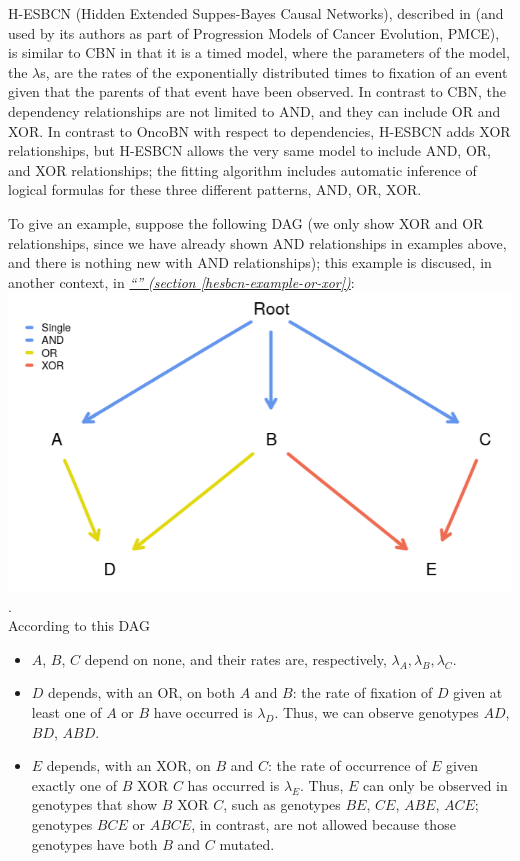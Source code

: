 \documentclass[a4paper,11pt]{article}
\newcommand*{\qref}[1]{\hyperref[{#1}]{\textit{``\nameref*{#1}'' (section \ref*{#1})}}}
\begin{document}
H-ESBCN (Hidden Extended Suppes-Bayes Causal Networks), described in \citet{angaroni2021} (and used by its authors as part of Progression Models of Cancer Evolution, PMCE), is similar to CBN in that it is a timed model, where the parameters of the model, the $\lambda$s,  are  the rates of the exponentially distributed times to fixation of an  event given that the parents of that event have been observed. In contrast to CBN, the dependency relationships are not limited to AND, and they can include OR and XOR. In contrast to OncoBN with respect to dependencies, H-ESBCN adds XOR relationships, but H-ESBCN allows the very same model to include AND, OR, and XOR relationships; the fitting algorithm includes automatic inference of logical formulas for these three different patterns, AND, OR, XOR.


To give an example, suppose the following DAG (we only show XOR and OR relationships, since we have already shown AND relationships in examples above, and there is nothing new with AND relationships); this example is discused, in another context, in \qref{hesbcn-example-or-xor}:\\

\includegraphics[width=.60\linewidth]{./dag-h-1.png}.\\

According to this DAG
\begin{itemize}
 \item $A$, $B$, $C$ depend on none, and their rates are, respectively, $\lambda_A, \lambda_B, \lambda_C$.
 \item $D$ depends, with an OR, on both $A$ and $B$: the rate of fixation of $D$ given at least one of $A$ or $B$ have occurred is $\lambda_D$. Thus, we can observe genotypes $AD$, $BD$, $ABD$.
 \item $E$ depends, with an XOR, on $B$ and $C$: the rate of occurrence of $E$ given exactly one of $B$ XOR $C$ has occurred is $\lambda_E$. Thus, $E$ can only be observed in genotypes that show $B$ XOR $C$, such as genotypes $BE$, $CE$, $ABE$, $ACE$; genotypes $BCE$ or $ABCE$, in contrast, are not allowed because those genotypes have both $B$ and $C$ mutated. \end{itemize}
\end{document}

